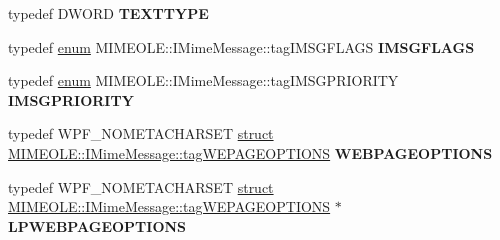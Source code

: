 \begin{DoxyCompactItemize}
\item 
\mbox{\label{interface_m_i_m_e_o_l_e_1_1_i_mime_message_a8613d1facca7406c3093005a91fd4b7f}} 
typedef D\+W\+O\+RD {\bfseries T\+E\+X\+T\+T\+Y\+PE}
\item 
\mbox{\label{interface_m_i_m_e_o_l_e_1_1_i_mime_message_adba7df633090e9910ce4c5b167a96665}} 
typedef \hyperlink{interfaceenum}{enum} M\+I\+M\+E\+O\+L\+E\+::\+I\+Mime\+Message\+::tag\+I\+M\+S\+G\+F\+L\+A\+GS {\bfseries I\+M\+S\+G\+F\+L\+A\+GS}
\item 
\mbox{\label{interface_m_i_m_e_o_l_e_1_1_i_mime_message_a61f84ce0ef539be57839e56ea746fbff}} 
typedef \hyperlink{interfaceenum}{enum} M\+I\+M\+E\+O\+L\+E\+::\+I\+Mime\+Message\+::tag\+I\+M\+S\+G\+P\+R\+I\+O\+R\+I\+TY {\bfseries I\+M\+S\+G\+P\+R\+I\+O\+R\+I\+TY}
\item 
\mbox{\label{interface_m_i_m_e_o_l_e_1_1_i_mime_message_ae69636e27738b97f0f92a935113dcc4f}} 
typedef W\+P\+F\+\_\+\+N\+O\+M\+E\+T\+A\+C\+H\+A\+R\+S\+ET \hyperlink{interfacestruct}{struct} \hyperlink{struct_m_i_m_e_o_l_e_1_1_i_mime_message_1_1tag_w_e_p_a_g_e_o_p_t_i_o_n_s}{M\+I\+M\+E\+O\+L\+E\+::\+I\+Mime\+Message\+::tag\+W\+E\+P\+A\+G\+E\+O\+P\+T\+I\+O\+NS} {\bfseries W\+E\+B\+P\+A\+G\+E\+O\+P\+T\+I\+O\+NS}
\item 
\mbox{\label{interface_m_i_m_e_o_l_e_1_1_i_mime_message_ad1e337a5514ffd7d14e3091ca4371672}} 
typedef W\+P\+F\+\_\+\+N\+O\+M\+E\+T\+A\+C\+H\+A\+R\+S\+ET \hyperlink{interfacestruct}{struct} \hyperlink{struct_m_i_m_e_o_l_e_1_1_i_mime_message_1_1tag_w_e_p_a_g_e_o_p_t_i_o_n_s}{M\+I\+M\+E\+O\+L\+E\+::\+I\+Mime\+Message\+::tag\+W\+E\+P\+A\+G\+E\+O\+P\+T\+I\+O\+NS} $\ast$ {\bfseries L\+P\+W\+E\+B\+P\+A\+G\+E\+O\+P\+T\+I\+O\+NS}
\end{DoxyCompactItemize}
